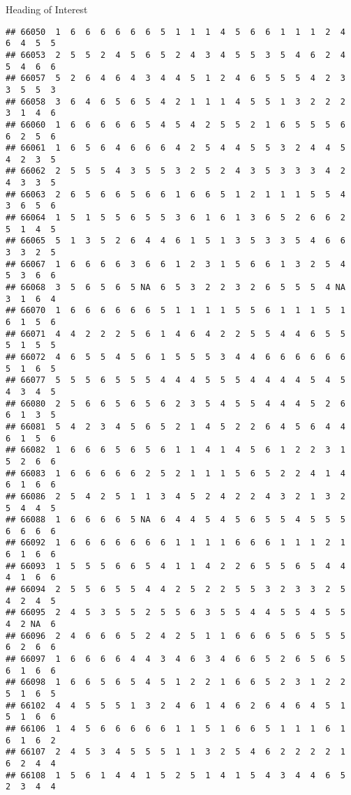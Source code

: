 \documentclass[
  ignorenonframetext,
]{beamer}
\begin{document}
\begin{frame}[fragile]{Heading of Interest}
\begin{verbatim}
## 66050  1  6  6  6  6  6  6  5  1  1  1  4  5  6  6  1  1  1  2  4  6  4  5  5
## 66053  2  5  5  2  4  5  6  5  2  4  3  4  5  5  3  5  4  6  2  4  5  4  6  6
## 66057  5  2  6  4  6  4  3  4  4  5  1  2  4  6  5  5  5  4  2  3  3  5  5  3
## 66058  3  6  4  6  5  6  5  4  2  1  1  1  4  5  5  1  3  2  2  2  3  1  4  6
## 66060  1  6  6  6  6  6  5  4  5  4  2  5  5  2  1  6  5  5  5  6  6  2  5  6
## 66061  1  6  5  6  4  6  6  6  4  2  5  4  4  5  5  3  2  4  4  5  4  2  3  5
## 66062  2  5  5  5  4  3  5  5  3  2  5  2  4  3  5  3  3  3  4  2  4  3  3  5
## 66063  2  6  5  6  6  5  6  6  1  6  6  5  1  2  1  1  1  5  5  4  3  6  5  6
## 66064  1  5  1  5  5  6  5  5  3  6  1  6  1  3  6  5  2  6  6  2  5  1  4  5
## 66065  5  1  3  5  2  6  4  4  6  1  5  1  3  5  3  3  5  4  6  6  3  3  2  5
## 66067  1  6  6  6  6  3  6  6  1  2  3  1  5  6  6  1  3  2  5  4  5  3  6  6
## 66068  3  5  6  5  6  5 NA  6  5  3  2  2  3  2  6  5  5  5  4 NA  3  1  6  4
## 66070  1  6  6  6  6  6  6  5  1  1  1  1  5  5  6  1  1  1  5  1  6  1  5  6
## 66071  4  4  2  2  2  5  6  1  4  6  4  2  2  5  5  4  4  6  5  5  5  1  5  5
## 66072  4  6  5  5  4  5  6  1  5  5  5  3  4  4  6  6  6  6  6  6  5  1  6  5
## 66077  5  5  5  6  5  5  5  4  4  4  5  5  5  4  4  4  4  5  4  5  4  3  4  5
## 66080  2  5  6  6  5  6  5  6  2  3  5  4  5  5  4  4  4  5  2  6  6  1  3  5
## 66081  5  4  2  3  4  5  6  5  2  1  4  5  2  2  6  4  5  6  4  4  6  1  5  6
## 66082  1  6  6  6  5  6  5  6  1  1  4  1  4  5  6  1  2  2  3  1  5  2  6  6
## 66083  1  6  6  6  6  6  2  5  2  1  1  1  5  6  5  2  2  4  1  4  6  1  6  6
## 66086  2  5  4  2  5  1  1  3  4  5  2  4  2  2  4  3  2  1  3  2  5  4  4  5
## 66088  1  6  6  6  6  5 NA  6  4  4  5  4  5  6  5  5  4  5  5  5  6  6  6  6
## 66092  1  6  6  6  6  6  6  6  1  1  1  1  6  6  6  1  1  1  2  1  6  1  6  6
## 66093  1  5  5  5  6  6  5  4  1  1  4  2  2  6  5  5  6  5  4  4  4  1  6  6
## 66094  2  5  5  6  5  5  4  4  2  5  2  2  5  5  3  2  3  3  2  5  4  2  4  5
## 66095  2  4  5  3  5  5  2  5  5  6  3  5  5  4  4  5  5  4  5  5  4  2 NA  6
## 66096  2  4  6  6  6  5  2  4  2  5  1  1  6  6  6  5  6  5  5  5  6  2  6  6
## 66097  1  6  6  6  6  4  4  3  4  6  3  4  6  6  5  2  6  5  6  5  6  1  6  6
## 66098  1  6  6  5  6  5  4  5  1  2  2  1  6  6  5  2  3  1  2  2  5  1  6  5
## 66102  4  4  5  5  5  1  3  2  4  6  1  4  6  2  6  4  6  4  5  1  5  1  6  6
## 66106  1  4  5  6  6  6  6  6  1  1  5  1  6  6  5  1  1  1  6  1  6  1  6  2
## 66107  2  4  5  3  4  5  5  5  1  1  3  2  5  4  6  2  2  2  2  1  6  2  4  4
## 66108  1  5  6  1  4  4  1  5  2  5  1  4  1  5  4  3  4  4  6  5  2  3  4  4

\end{verbatim}
\end{frame}
\end{document}
